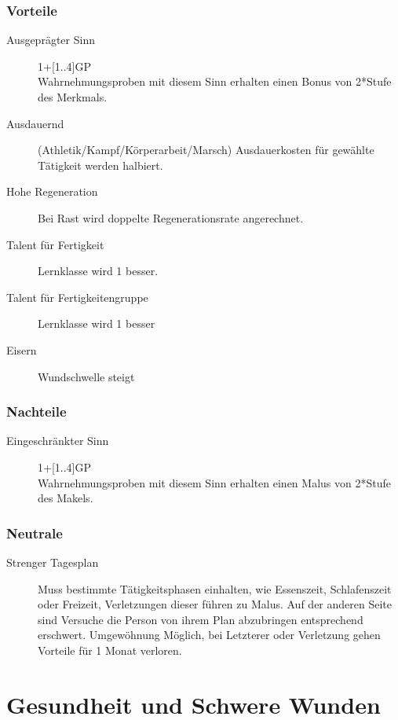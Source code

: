 \documentclass[a4paper,12pt,oneside]{book}
\begin{document}
\subsection{Vorteile}
\begin{description}
\item[Ausgeprägter Sinn]1+[1..4]GP
\\Wahrnehmungsproben mit diesem Sinn erhalten einen Bonus von 2*Stufe des Merkmals.
\item[Ausdauernd] (Athletik/Kampf/Körperarbeit/Marsch) Ausdauerkosten für gewählte Tätigkeit werden halbiert.
\item[Hohe Regeneration] Bei Rast wird doppelte Regenerationsrate angerechnet.
\item[Talent für Fertigkeit] Lernklasse wird 1 besser.
\item[Talent für Fertigkeitengruppe] Lernklasse wird 1 besser
\item[Eisern] Wundschwelle steigt
\end{description}

\subsection{Nachteile}
\begin{description}
\item[Eingeschränkter Sinn]1+[1..4]GP
\\Wahrnehmungsproben mit diesem Sinn erhalten einen Malus von 2*Stufe des Makels.
\end{description}

\subsection{Neutrale}
\begin{description}
\item[Strenger Tagesplan] Muss bestimmte Tätigkeitsphasen einhalten, wie Essenszeit, Schlafenszeit oder Freizeit, Verletzungen dieser führen zu Malus. Auf der anderen Seite sind Versuche die Person von ihrem Plan abzubringen entsprechend erschwert. Umgewöhnung Möglich, bei Letzterer oder Verletzung gehen Vorteile für 1 Monat verloren.
\end{description}    

\chapter{Gesundheit und Schwere Wunden}
\end{document}
